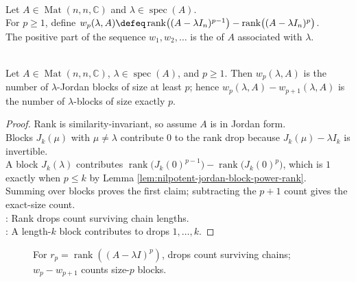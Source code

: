 \begin{definition} \label{def:weyr-characteristic} \\
Let $A\in\operatorname{Mat}(n,n,\mathbb{C})$ and $\lambda\in\operatorname{spec}(A)$.\\
For $p\geq1$, define $w_p(\lambda,A)\defeq \operatorname{rank}\bigl((A-\lambda I_n)^{p-1}\bigr) - \operatorname{rank}\bigl((A-\lambda I_n)^p\bigr)$.\\
The positive part of the sequence $w_1,w_2,\ldots$ is the  of $A$ associated with $\lambda$.
\end{definition}

\begin{theorem} \label{thm:jordan-block-sizes-from-rank-drops} \\
Let $A\in\operatorname{Mat}(n,n,\mathbb{C})$, $\lambda\in\operatorname{spec}(A)$, and $p\geq1$. Then $w_p(\lambda,A)$ is the number of $\lambda$-Jordan blocks of size at least $p$; hence $w_p(\lambda,A)-w_{p+1}(\lambda,A)$ is the number of $\lambda$-blocks of size exactly $p$.
\begin{proof}
Rank is similarity-invariant, so assume $A$ is in Jordan form.\\
Blocks $J_k(\mu)$ with $\mu\neq\lambda$ contribute $0$ to the rank drop because $J_k(\mu)-\lambda I_k$ is invertible.\\
A block $J_k(\lambda)$ contributes $\operatorname{rank}\bigl(J_k(0)^{p-1}\bigr)-\operatorname{rank}\bigl(J_k(0)^p\bigr)$, which is $1$ exactly when $p\leq k$ by Lemma \ref{lem:nilpotent-jordan-block-power-rank}.\\
Summing over blocks proves the first claim; subtracting the $p+1$ count gives the exact-size count.\\
: Rank drops count surviving chain lengths.\\
: A length-$k$ block contributes to drops $1,\ldots,k$.
\end{proof}
\end{theorem}

\begin{figure}[H]
  \centering
  
  \caption{For $r_p=\operatorname{rank}((A-\lambda I)^p)$, drops count surviving chains; $w_p-w_{p+1}$ counts size-$p$ blocks.}
  \label{fig:weyr-rank-drops-jordan-blocks}
\end{figure}

